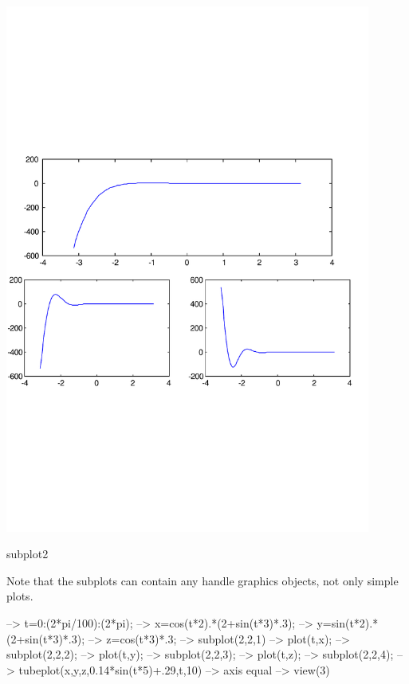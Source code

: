  
\begin{DoxyImage}
\includegraphics[width=12cm]{subplot2}
\caption{subplot2}
\end{DoxyImage}
 Note that the subplots can contain any handle graphics objects, not only simple plots.


\begin{DoxyVerbInclude}
--> t=0:(2*pi/100):(2*pi);
--> x=cos(t*2).*(2+sin(t*3)*.3);
--> y=sin(t*2).*(2+sin(t*3)*.3);
--> z=cos(t*3)*.3;
--> subplot(2,2,1)
--> plot(t,x);
--> subplot(2,2,2);
--> plot(t,y);
--> subplot(2,2,3);
--> plot(t,z);
--> subplot(2,2,4);
--> tubeplot(x,y,z,0.14*sin(t*5)+.29,t,10)
--> axis equal
--> view(3)
\end{DoxyVerbInclude}


